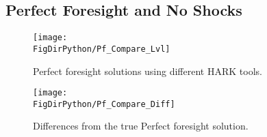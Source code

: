 \documentclass[../CGMPort.tex]{subfiles}
\begin{document}
\subsection{Perfect Foresight and No Shocks}

\begin{figure}
	\texttt{[image: \\FigDirPython/Pf\_Compare\_Lvl]}
	\caption{Perfect foresight solutions using different HARK tools.}
\end{figure}

\begin{figure}
	\texttt{[image: \\FigDirPython/Pf\_Compare\_Diff]}
	\caption{Differences from the true Perfect foresight solution.}
\end{figure}
\end{document}
